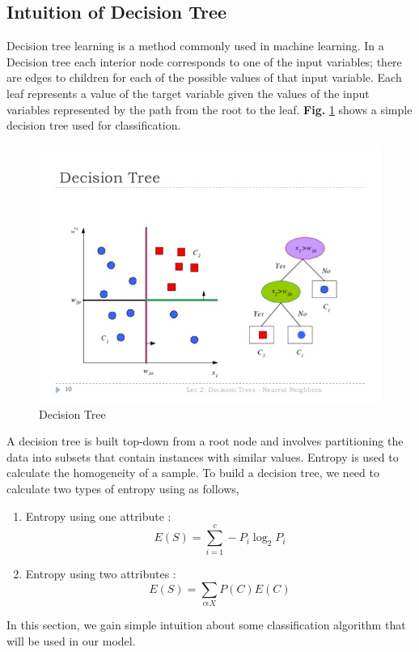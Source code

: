 \documentclass[12pt,a4paper]{report}
\begin{document}
\subsection{Intuition of Decision Tree}
Decision tree learning is a method commonly used in machine learning. In a Decision tree each interior node  corresponds to one of the input variables; there are edges to children for each of the possible values of that input variable. Each leaf represents a value of the target variable given the values of the input variables represented by the path from the root to the leaf. \textbf{Fig.} \ref{fig:DCT} shows a simple decision tree used for classification.
\begin{figure}[h!]
    \centering
    \includegraphics[scale=0.4]{Figures/decision_tree.jpg}
    \caption{Decision Tree}
    \label{fig:DCT}
\end{figure}

A decision tree is built top-down from a root node and involves partitioning the data into subsets that contain instances with similar values. Entropy is used to calculate the homogeneity of a sample. To build a decision tree, we need to calculate two types of entropy using as follows,
\begin{enumerate}
    \item Entropy using one attribute :
    \begin{equation}
         E(S) = \sum_{i=1}^{c}-P_i \log_2P_i
    \end{equation}
    \item Entropy using two attributes :
    \begin{equation}
        E(S) = \sum_{c\epsilon X}{}P(C)E(C) 
    \end{equation}
    
\end{enumerate}
\par\noindent
In this section, we gain simple intuition about some classification algorithm that will be used in our model. 
\end{document}

